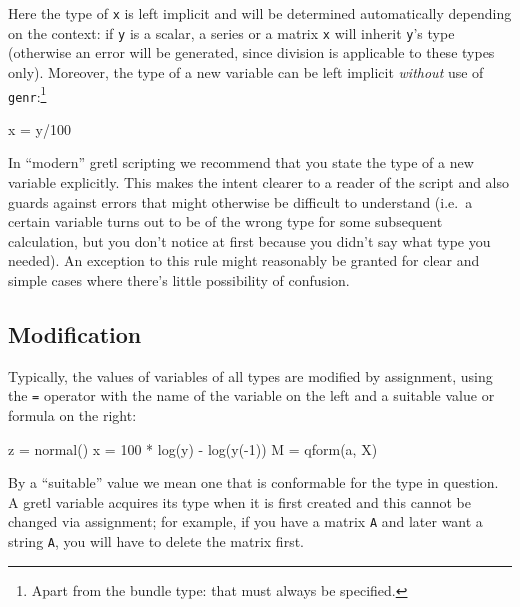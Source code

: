 Here the type of \texttt{x} is left implicit and will be determined
automatically depending on the context: if \texttt{y} is a scalar, a
series or a matrix \texttt{x} will inherit \texttt{y}'s type
(otherwise an error will be generated, since division is applicable to
these types only). Moreover, the type of a new variable can be left
implicit \textit{without} use of \texttt{genr}:\footnote{Apart from
  the bundle type: that must always be specified.}

\begin{code}
x = y/100
\end{code}

In ``modern'' gretl scripting we recommend that you state the
type of a new variable explicitly. This makes the intent clearer to a
reader of the script and also guards against errors that might
otherwise be difficult to understand (i.e.\ a certain variable turns
out to be of the wrong type for some subsequent calculation, but you
don't notice at first because you didn't say what type you needed). An
exception to this rule might reasonably be granted for clear and
simple cases where there's little possibility of confusion.

\subsection{Modification}

Typically, the values of variables of all types are modified
by assignment, using the \texttt{=} operator with the name of the
variable on the left and a suitable value or formula on the right:

\begin{code}
z = normal()
x = 100 * log(y) - log(y(-1))
M = qform(a, X)
\end{code}

By a ``suitable'' value we mean one that is conformable for the type
in question. A gretl variable acquires its type when it is first
created and this cannot be changed via assignment; for example, if you
have a matrix \texttt{A} and later want a string \texttt{A}, you will
have to delete the matrix first.


